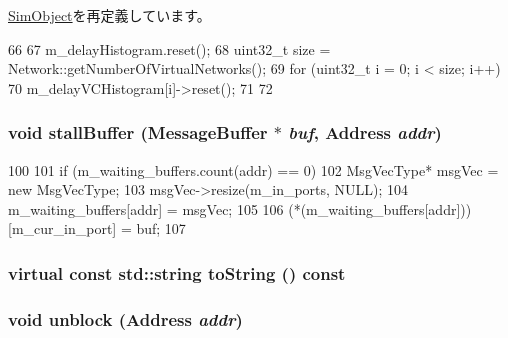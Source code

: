 \hyperlink{classSimObject_a65880e61108132689a1bd769b9187fb7}{SimObject}を再定義しています。


\begin{DoxyCode}
66 {
67     m_delayHistogram.reset();
68     uint32_t size = Network::getNumberOfVirtualNetworks();
69     for (uint32_t i = 0; i < size; i++) {
70         m_delayVCHistogram[i]->reset();
71     }
72 }
\end{DoxyCode}
\hypertarget{classAbstractController_a4f512122c5d5042bb9da1a0d1fb4c920}{
\subsubsection[{stallBuffer}]{\setlength{\rightskip}{0pt plus 5cm}void stallBuffer ({\bf MessageBuffer} $\ast$ {\em buf}, \/  {\bf Address} {\em addr})}}
\label{classAbstractController_a4f512122c5d5042bb9da1a0d1fb4c920}



\begin{DoxyCode}
100 {
101     if (m_waiting_buffers.count(addr) == 0) {
102         MsgVecType* msgVec = new MsgVecType;
103         msgVec->resize(m_in_ports, NULL);
104         m_waiting_buffers[addr] = msgVec;
105     }
106     (*(m_waiting_buffers[addr]))[m_cur_in_port] = buf;
107 }
\end{DoxyCode}
\hypertarget{classAbstractController_adb24cab1ca6d817bdcdef245731b8b77}{
\subsubsection[{toString}]{\setlength{\rightskip}{0pt plus 5cm}virtual const std::string toString () const}}
\label{classAbstractController_adb24cab1ca6d817bdcdef245731b8b77}
\hypertarget{classAbstractController_a6da828f9409955e467e80f6d5290fcfd}{
\subsubsection[{unblock}]{\setlength{\rightskip}{0pt plus 5cm}void unblock ({\bf Address} {\em addr})}}
\label{classAbstractController_a6da828f9409955e467e80f6d5290fcfd}



